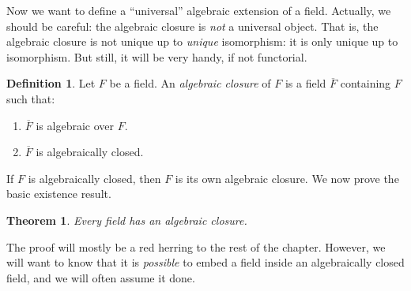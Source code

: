 \documentclass{stacks-project}
\theoremstyle{plain}
\newtheorem{theorem}[subsection]{Theorem}
\theoremstyle{definition}
\newtheorem{definition}[subsection]{Definition}
\theoremstyle{remark}
\numberwithin{equation}{subsection}
\begin{document}
\noindent
Now we want to define a ``universal'' algebraic extension of a field.
Actually, we should be careful: the algebraic closure is {\it not} a
universal object. That is, the algebraic closure is not unique up to
{\it unique} isomorphism: it is only unique up to isomorphism. But still,
it will be very handy, if not functorial.

\begin{definition}
\label{definition-algebraic-closure}
Let $F$ be a field. An {\it algebraic closure} of $F$ is a field
$\overline{F}$ containing $F$ such that:
\begin{enumerate}
\item $\overline{F}$ is algebraic over $F$.
\item $\overline{F}$ is algebraically closed.
\end{enumerate}
\end{definition}

\noindent
If $F$ is algebraically closed, then $F$ is its own algebraic closure.
We now prove the basic existence result.

\begin{theorem}
\label{theorem-existence-algebraic-closure}
Every field has an algebraic closure.
\end{theorem}

\noindent
The proof will mostly be a red herring to the rest of the chapter. However, we
will want to know that it is {\it possible} to embed a field inside an
algebraically closed field, and we will often assume it done.
\end{document}
